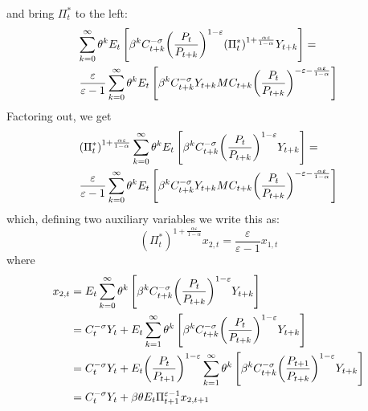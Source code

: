 \documentclass[12pt,a4paper]{article}
\begin{document}
and bring $\Pi_t^*$ to the left:
\begin{equation}\begin{gathered}
  \sum\limits_{k = 0}^\infty  {{\theta ^k}{E_t}\left[ {{\beta ^k}C_{t + k}^{ - \sigma }{{\left( {\frac{{{P_t}}}{{{P_{t + k}}}}} \right)}^{1 - \varepsilon }}{{\left( {\Pi _t^*} \right)}^{1 + \frac{{\alpha \varepsilon }}{{1 - \alpha }}}}{Y_{t + k}}} \right]}  =  \hfill \\
  \frac{\varepsilon }{{\varepsilon  - 1}}\sum\limits_{k = 0}^\infty  {{\theta ^k}{E_t}\left[ {\beta ^k}C_{t + k}^{ - \sigma }{Y_{t + k}}M{C_{t + k}}{{{\left( {\frac{{{P_t}}}{{{P_{t + k}}}}} \right)}^{ - \varepsilon  - \frac{{\alpha \varepsilon }}{{1 - \alpha }}}}} \right]}  \hfill \\
\end{gathered} \end{equation}
Factoring out, we get
\begin{equation}\begin{gathered}
  {\left( {\Pi _t^*} \right)^{1 + \frac{{\alpha \varepsilon }}{{1 - \alpha }}}}\sum\limits_{k = 0}^\infty  {{\theta ^k}{E_t}\left[ {{\beta ^k}C_{t + k}^{ - \sigma }{{\left( {\frac{{{P_t}}}{{{P_{t + k}}}}} \right)}^{1 - \varepsilon }}{Y_{t + k}}} \right]}  =  \hfill \\
  \frac{\varepsilon }{{\varepsilon  - 1}}\sum\limits_{k = 0}^\infty  {{\theta ^k}{E_t}\left[ {\beta ^k}C_{t + k}^{ - \sigma }{Y_{t + k}}M{C_{t + k}}{{{\left( {\frac{{{P_t}}}{{{P_{t + k}}}}} \right)}^{ - \varepsilon  - \frac{{\alpha \varepsilon }}{{1 - \alpha }}}}} \right]}  \hfill \\
\end{gathered} \end{equation}
which, defining two auxiliary variables we write this as:
\begin{equation}{\left( {\Pi _t^*} \right)^{1 + \frac{{\alpha \varepsilon }}{{1 - \alpha }}}}{x_{2,t}} = \frac{\varepsilon }{{\varepsilon  - 1}}{x_{1,t}}\end{equation}
where
\begin{align}
  {x_{2,t}} &= {E_t}\sum\limits_{k = 0}^\infty  {{\theta ^k}\left[ {{\beta ^k}C_{t + k}^{ - \sigma }{{\left( {\frac{{{P_t}}}{{{P_{t + k}}}}} \right)}^{1 - \varepsilon }}{Y_{t + k}}} \right]}  \hfill \\
   &= C_t^{ - \sigma }{Y_t} + {E_t}\sum\limits_{k = 1}^\infty  {{\theta ^k}\left[ {{\beta ^k}C_{t + k}^{ - \sigma }{{\left( {\frac{{{P_t}}}{{{P_{t + k}}}}} \right)}^{1 - \varepsilon }}{Y_{t + k}}} \right]}  \hfill \\
   &= C_t^{ - \sigma }{Y_t} + {E_t}{\left( {\frac{{{P_t}}}{{{P_{t + 1}}}}} \right)^{1 - \varepsilon }}\sum\limits_{k = 1}^\infty  {{\theta ^k}\left[ {{\beta ^k}C_{t + k}^{ - \sigma }{{\left( {\frac{{{P_{t + 1}}}}{{{P_{t + k}}}}} \right)}^{1 - \varepsilon }}{Y_{t + k}}} \right]}  \hfill \\
   &= C_t^{ - \sigma }{Y_t} + \beta \theta {E_t}\Pi _{t + 1}^{\varepsilon  - 1}{x_{2,t + 1}}
\end{align}
\end{document}
